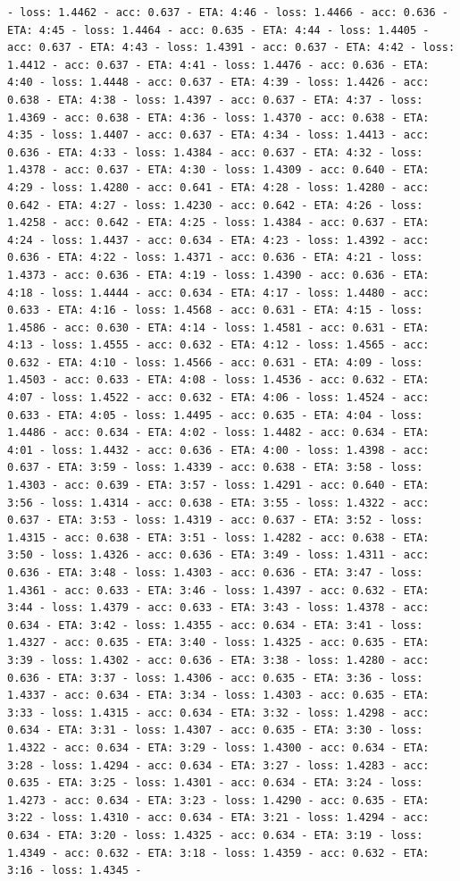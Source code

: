 \documentclass[11pt]{article}
\begin{document}
\begin{Verbatim}[commandchars=\\\{\}]
- loss: 1.4462 - acc: 0.637 - ETA: 4:46 - loss: 1.4466 - acc: 0.636 - ETA: 4:45 - loss: 1.4464 - acc: 0.635 - ETA: 4:44 - loss: 1.4405 - acc: 0.637 - ETA: 4:43 - loss: 1.4391 - acc: 0.637 - ETA: 4:42 - loss: 1.4412 - acc: 0.637 - ETA: 4:41 - loss: 1.4476 - acc: 0.636 - ETA: 4:40 - loss: 1.4448 - acc: 0.637 - ETA: 4:39 - loss: 1.4426 - acc: 0.638 - ETA: 4:38 - loss: 1.4397 - acc: 0.637 - ETA: 4:37 - loss: 1.4369 - acc: 0.638 - ETA: 4:36 - loss: 1.4370 - acc: 0.638 - ETA: 4:35 - loss: 1.4407 - acc: 0.637 - ETA: 4:34 - loss: 1.4413 - acc: 0.636 - ETA: 4:33 - loss: 1.4384 - acc: 0.637 - ETA: 4:32 - loss: 1.4378 - acc: 0.637 - ETA: 4:30 - loss: 1.4309 - acc: 0.640 - ETA: 4:29 - loss: 1.4280 - acc: 0.641 - ETA: 4:28 - loss: 1.4280 - acc: 0.642 - ETA: 4:27 - loss: 1.4230 - acc: 0.642 - ETA: 4:26 - loss: 1.4258 - acc: 0.642 - ETA: 4:25 - loss: 1.4384 - acc: 0.637 - ETA: 4:24 - loss: 1.4437 - acc: 0.634 - ETA: 4:23 - loss: 1.4392 - acc: 0.636 - ETA: 4:22 - loss: 1.4371 - acc: 0.636 - ETA: 4:21 - loss: 1.4373 - acc: 0.636 - ETA: 4:19 - loss: 1.4390 - acc: 0.636 - ETA: 4:18 - loss: 1.4444 - acc: 0.634 - ETA: 4:17 - loss: 1.4480 - acc: 0.633 - ETA: 4:16 - loss: 1.4568 - acc: 0.631 - ETA: 4:15 - loss: 1.4586 - acc: 0.630 - ETA: 4:14 - loss: 1.4581 - acc: 0.631 - ETA: 4:13 - loss: 1.4555 - acc: 0.632 - ETA: 4:12 - loss: 1.4565 - acc: 0.632 - ETA: 4:10 - loss: 1.4566 - acc: 0.631 - ETA: 4:09 - loss: 1.4503 - acc: 0.633 - ETA: 4:08 - loss: 1.4536 - acc: 0.632 - ETA: 4:07 - loss: 1.4522 - acc: 0.632 - ETA: 4:06 - loss: 1.4524 - acc: 0.633 - ETA: 4:05 - loss: 1.4495 - acc: 0.635 - ETA: 4:04 - loss: 1.4486 - acc: 0.634 - ETA: 4:02 - loss: 1.4482 - acc: 0.634 - ETA: 4:01 - loss: 1.4432 - acc: 0.636 - ETA: 4:00 - loss: 1.4398 - acc: 0.637 - ETA: 3:59 - loss: 1.4339 - acc: 0.638 - ETA: 3:58 - loss: 1.4303 - acc: 0.639 - ETA: 3:57 - loss: 1.4291 - acc: 0.640 - ETA: 3:56 - loss: 1.4314 - acc: 0.638 - ETA: 3:55 - loss: 1.4322 - acc: 0.637 - ETA: 3:53 - loss: 1.4319 - acc: 0.637 - ETA: 3:52 - loss: 1.4315 - acc: 0.638 - ETA: 3:51 - loss: 1.4282 - acc: 0.638 - ETA: 3:50 - loss: 1.4326 - acc: 0.636 - ETA: 3:49 - loss: 1.4311 - acc: 0.636 - ETA: 3:48 - loss: 1.4303 - acc: 0.636 - ETA: 3:47 - loss: 1.4361 - acc: 0.633 - ETA: 3:46 - loss: 1.4397 - acc: 0.632 - ETA: 3:44 - loss: 1.4379 - acc: 0.633 - ETA: 3:43 - loss: 1.4378 - acc: 0.634 - ETA: 3:42 - loss: 1.4355 - acc: 0.634 - ETA: 3:41 - loss: 1.4327 - acc: 0.635 - ETA: 3:40 - loss: 1.4325 - acc: 0.635 - ETA: 3:39 - loss: 1.4302 - acc: 0.636 - ETA: 3:38 - loss: 1.4280 - acc: 0.636 - ETA: 3:37 - loss: 1.4306 - acc: 0.635 - ETA: 3:36 - loss: 1.4337 - acc: 0.634 - ETA: 3:34 - loss: 1.4303 - acc: 0.635 - ETA: 3:33 - loss: 1.4315 - acc: 0.634 - ETA: 3:32 - loss: 1.4298 - acc: 0.634 - ETA: 3:31 - loss: 1.4307 - acc: 0.635 - ETA: 3:30 - loss: 1.4322 - acc: 0.634 - ETA: 3:29 - loss: 1.4300 - acc: 0.634 - ETA: 3:28 - loss: 1.4294 - acc: 0.634 - ETA: 3:27 - loss: 1.4283 - acc: 0.635 - ETA: 3:25 - loss: 1.4301 - acc: 0.634 - ETA: 3:24 - loss: 1.4273 - acc: 0.634 - ETA: 3:23 - loss: 1.4290 - acc: 0.635 - ETA: 3:22 - loss: 1.4310 - acc: 0.634 - ETA: 3:21 - loss: 1.4294 - acc: 0.634 - ETA: 3:20 - loss: 1.4325 - acc: 0.634 - ETA: 3:19 - loss: 1.4349 - acc: 0.632 - ETA: 3:18 - loss: 1.4359 - acc: 0.632 - ETA: 3:16 - loss: 1.4345 - 
\end{Verbatim}
\end{document}
